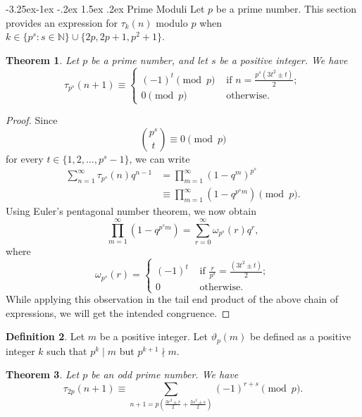 \documentclass[10pt]{article}
\makeatletter
\renewcommand\subsection{\@startsection{subsection}{2}{\z@}
{-3.25ex\@plus -1ex \@minus -.2ex}
{1.5ex \@plus .2ex}
{\normalfont\normalsize\bfseries\boldmath}}
\newtheorem{theorem}{Theorem}[section]
\theoremstyle{definition}
\newtheorem{definition}[theorem]{Definition}
\makeatother
\begin{document}
\subsection{ Prime Moduli}
Let $p$ be a prime number. This section provides an expression for $\tau_k(n)$ modulo $p$ when $k\in\{p^s:s\in\mathbb N\}\cup\{2p, 2p+1, p^2+1\}$.
\begin{theorem}\label{tau-prime-modulo}
Let $p$ be a prime number, and let $s$ be a positive integer. We have
\begin{equation}
\tau_{p^s}(n+1)\equiv\begin{cases}
(-1)^t\pmod{p}&\text{ if $n=\frac{p^s(3t^2\pm t)}{2}$};\\ 
0\pmod{p}&\text{ otherwise.}
\end{cases}
\end{equation}
\end{theorem}
\begin{proof}
Since 
\[{{p^s}\choose{t}}\equiv0\pmod{p}
\]
for every $t\in\{1,2,\ldots ,p^s-1\}$, we can write
\begin{align*}
\sum_{n=1}^{\infty}\tau_{p^s}(n)q^{n-1}&=\prod_{m=1}^{\infty}(1-q^m)^{p^s}\\
&\equiv\prod_{m=1}^{\infty}(1-q^{p^sm})\pmod{p}.
\end{align*}
Using Euler's pentagonal number theorem, we now obtain
\[\prod_{m=1}^{\infty}(1-q^{p^sm})=\sum_{r=0}^{\infty}\omega_{p^s}(r)q^r,
\]
where 
\[\omega_{p^s}(r)=\begin{cases}
(-1)^t&\text{ if $\frac{r}{p^s}=\frac{(3t^2\pm t)}{2}$};\\ 
0&\text{ otherwise}.
\end{cases}
\]
While applying this observation in the tail end product of the above chain of expressions, we will get the intended congruence.
\end{proof}
\begin{definition}
Let $m$ be a positive integer. Let $\vartheta_p(m)$ be defined as a positive integer $k$ such that $p^k\mid m$ but $p^{k+1}\nmid m$.
\end{definition}
\begin{theorem}Let $p$ be an odd prime number. We have
\begin{equation}
\tau_{2p}(n+1)\equiv\sum_{n+1=p\left(\frac{3r^2\pm r}{2}+\frac{3s^2\pm s}{2}\right)}(-1)^{r+s}\pmod{p}.
\end{equation}
\end{theorem}
\end{document}
